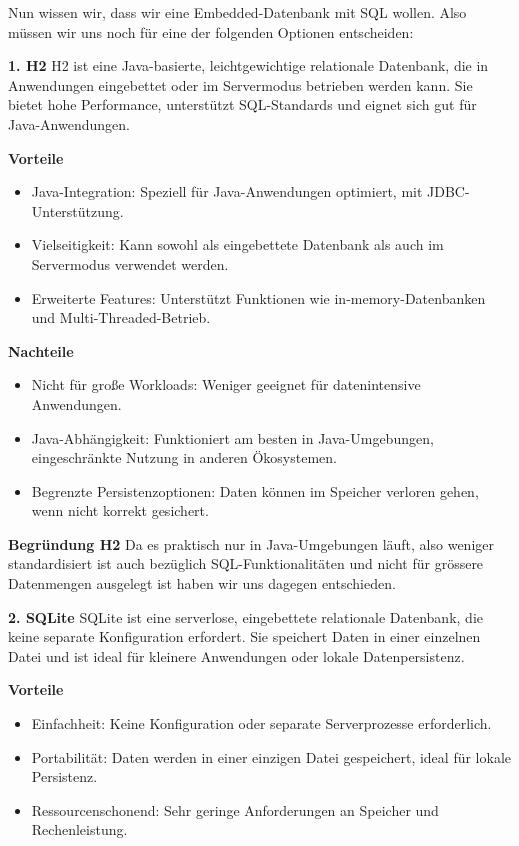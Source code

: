 \documentclass[a4paper,12pt]{report}
\begin{document}
    Nun wissen wir, dass wir eine Embedded-Datenbank mit SQL wollen.
    Also müssen wir uns noch für eine der folgenden Optionen entscheiden:

    \textbf{1. H2}
    H2 ist eine Java-basierte, leichtgewichtige relationale Datenbank,
    die in Anwendungen eingebettet oder im Servermodus betrieben werden kann.
    Sie bietet hohe Performance, unterstützt SQL-Standards und eignet sich gut für Java-Anwendungen.

    \textbf{Vorteile}
    \begin{itemize}
        \item Java-Integration: Speziell für Java-Anwendungen optimiert, mit JDBC-Unterstützung.
        \item Vielseitigkeit: Kann sowohl als eingebettete Datenbank als auch im Servermodus verwendet werden.
        \item Erweiterte Features: Unterstützt Funktionen wie in-memory-Datenbanken und Multi-Threaded-Betrieb.
    \end{itemize}

    \textbf{Nachteile}
    \begin{itemize}
        \item Nicht für große Workloads: Weniger geeignet für datenintensive Anwendungen.
        \item Java-Abhängigkeit: Funktioniert am besten in Java-Umgebungen, eingeschränkte Nutzung in anderen Ökosystemen.
        \item Begrenzte Persistenzoptionen: Daten können im Speicher verloren gehen, wenn nicht korrekt gesichert.
    \end{itemize}

    \textbf{Begründung H2} Da es praktisch nur in Java-Umgebungen läuft, also weniger standardisiert ist auch bezüglich SQL-Funktionalitäten und nicht für grössere Datenmengen
    ausgelegt ist haben wir uns dagegen entschieden.

    \textbf{2. SQLite}
    SQLite ist eine serverlose, eingebettete relationale Datenbank, die keine separate Konfiguration erfordert.
    Sie speichert Daten in einer einzelnen Datei und ist ideal für kleinere Anwendungen oder lokale Datenpersistenz.

    \textbf{Vorteile}
    \begin{itemize}
        \item Einfachheit: Keine Konfiguration oder separate Serverprozesse erforderlich.
        \item Portabilität: Daten werden in einer einzigen Datei gespeichert, ideal für lokale Persistenz.
        \item Ressourcenschonend: Sehr geringe Anforderungen an Speicher und Rechenleistung.
    \end{itemize}
\end{document}
